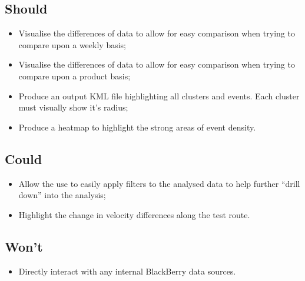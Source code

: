\subsection{Should}
\begin{itemize}
  \item Visualise the differences of data to allow for easy comparison when 
        trying to compare upon a weekly basis;
  \item Visualise the differences of data to allow for easy comparison when 
        trying to compare upon a product basis;
  \item Produce an output KML file highlighting all clusters and events. Each
        cluster must visually show it's radius;
  \item Produce a heatmap to highlight the strong areas of event density.
\end{itemize}


\subsection{Could}
\begin{itemize}
  \item Allow the use to easily apply filters to the analysed data to help 
        further ``drill down'' into the analysis;
  \item Highlight the change in velocity differences along the test route.
\end{itemize}


\subsection{Won't}
\begin{itemize}
  \item Directly interact with any internal BlackBerry data sources.
\end{itemize}